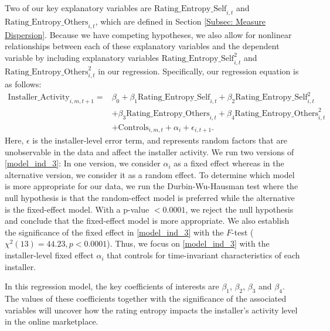 \documentclass[msom,blindrev]{informs3}
\begin{document}
	Two of our key explanatory  variables are $\text{Rating\_Entropy\_Self}_{i,t}$ and  $\text{Rating\_Entropy\_Others}_{i,t}$, which are defined in Section \ref{Subsec: Measure Dispersion}. Because we have competing hypotheses, we also allow for nonlinear relationships between each of these explanatory variables and the dependent variable by including explanatory variables $\text{Rating\_Entropy\_Self}_{i,t}^{2}$ and $\text{Rating\_Entropy\_Others}_{i,t}^{2}$ in our regression. Specifically, our regression equation is as follows:
	\begin{align}  \nonumber
	\text{Installer\_Activity}_{i,m,t+1}=&\beta_{0}+\beta_{1} \text{Rating\_Entropy\_Self}_{i,t}+\beta_{2} \text{Rating\_Entropy\_Self}_{i,t}^ {2}
	\\ \nonumber
	&+\beta_{3} \text{Rating\_Entropy\_Others}_{i,t}  +\beta_{4}\text{Rating\_Entropy\_Others}_{i,t}^{2} \\ \label{model_ind_3}
	&+ \text{Controls}_{i,m,t}+ \alpha_{i} + \epsilon_{i,t+1}.
	\end{align}
	Here, $\epsilon$ is the installer-level error term, and represents random factors that are unobservable in the data and affect the installer activity.  We run two versions of \eqref{model_ind_3}: In one version, we consider $\alpha_{i}$ as a fixed effect whereas in the alternative version, we consider it as a random effect. To determine which model is more appropriate for our data, we run the Durbin-Wu-Hausman test where the null hypothesis is that the random-effect model is preferred while the alternative is the fixed-effect model. With a p-value $<0.0001$, we reject the null hypothesis and conclude that the fixed-effect model is more appropriate. We also establish the significance of the fixed effect in \eqref{model_ind_3} with the $F$-test ($\chi^{2}(13)=44.23, p < 0.0001$). Thus, we focus on \eqref{model_ind_3} with the installer-level fixed effect $\alpha_{i}$ that controls for time-invariant characteristics of each installer.
	
	In this regression model, the key coefficients of interests are $\beta_{1}$, $\beta_{2}$, $\beta_{3}$ and $\beta_{4}$. The values of these coefficients together with the significance of the associated variables will uncover how the rating entropy impacts the installer's activity level in the online marketplace.
	
\end{document}
